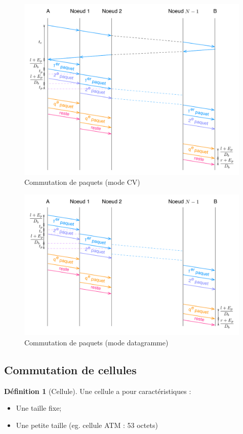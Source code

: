 \documentclass[11pt,english,french]{scrreprt}
\theoremstyle{remark}
\theoremstyle{definition}
\newtheorem*{def*}{Définition}
\begin{document}
\begin{figure}[h!]
	\center
	\includegraphics[scale=.75]{graphes/CPCV}
	\caption{Commutation de paquets (mode CV)}
\end{figure}

\begin{figure}[h!]
	\center
	\includegraphics[scale=.75]{graphes/CP}
	\caption{Commutation de paquets (mode datagramme)}
\end{figure}


\subsection{Commutation de cellules} %

\begin{def*}[Cellule]
	Une cellule a pour caractéristiques :\begin{itemize}
		\item Une taille fixe;
		\item Une petite taille (eg. cellule ATM : 53 octets)
	\end{itemize}
\end{def*}
\end{document}
